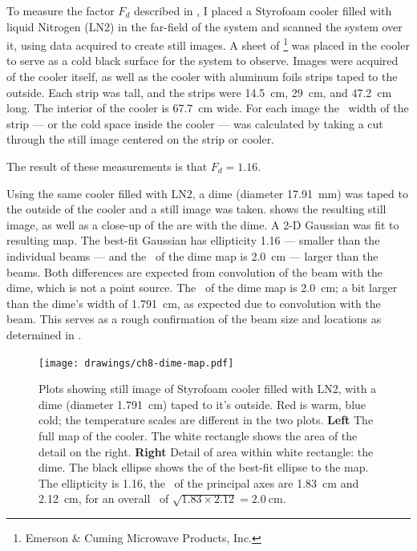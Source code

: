 To measure the factor $F_d$ described in , I placed a Styrofoam cooler filled with liquid Nitrogen (LN2) in the far-field of the system and scanned the system over it, using data acquired to create still images.
A sheet of \ecco\footnote{Emerson \& Cuming Microwave Products, Inc.} was placed in the cooler to serve as a cold black surface for the system to observe.
Images were acquired of the cooler itself, as well as the cooler with aluminum foils strips taped to the outside.
Each strip was  tall, and the strips were \SI{14.5}{\cm}, \SI{29}{\cm}, and \SI{47.2}{\cm} long.
The interior of the cooler is \SI{67.7}{\cm} wide.
For each image the \FWHM\ width of the strip --- or the cold space inside the cooler --- was calculated by taking a cut through the still image centered on the strip or cooler.

The result of these measurements is that $F_d = 1.16$.


Using the same cooler filled with LN2, a dime (diameter \SI{17.91}{\mm}) was taped to the outside of the cooler and a still image was taken.
 shows the resulting still image, as well as a close-up of the are with the dime.
A 2-D Gaussian was fit to resulting map.
The best-fit Gaussian has ellipticity 1.16 --- smaller than the individual beams --- and the \FWHM\ of the dime map is \SI{2.0}{\cm} --- larger than the beams.
Both differences are expected from convolution of the beam with the dime, which is not a point source.
The \FWHM\ of the dime map is \SI{2.0}{\cm}; a bit larger than the dime's width of \SI{1.791}{\cm}, as expected due to convolution with the beam.
This serves as a rough confirmation of the beam size and locations as determined in .

\begin{figure}[th]
\centering
\texttt{[image: drawings/ch8-dime-map.pdf]}
\caption{
  Plots showing still image of Styrofoam cooler filled with LN2, with a dime (diameter \SI{1.791}{\cm}) taped to it's outside.
  Red is warm, blue cold; the temperature scales are different in the two plots.
  \textbf{Left} The full map of the cooler. The white rectangle shows the area of the detail on the right.
  \textbf{Right} Detail of area within white rectangle: the dime.
  The black ellipse shows the \FWHM of the best-fit ellipse to the map. The ellipticity is \num{1.16}, the \FWHM\ of the principal axes are \SI{1.83}{\cm} and \SI{2.12}{\cm}, for an overall \FWHM\ of $\sqrt{1.83 \times 2.12} = \SI{2.0}{\cm}$.
}
\label{fig:ch8-dime-map}
\end{figure}


